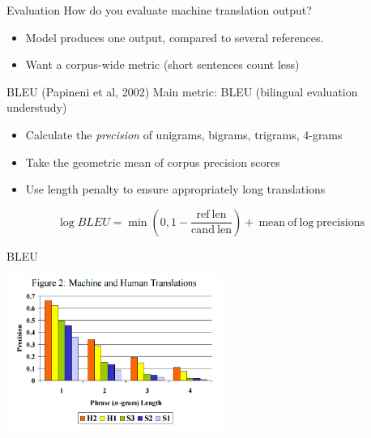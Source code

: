 \documentclass{beamer}
\begin{document}
{

}

\begin{frame}{Evaluation}
  How do you evaluate machine translation output?
  
  \begin{itemize}
  \item Model produces one output, compared to several references.
    \air
  \item Want a corpus-wide metric (short sentences count less)
  \end{itemize}

\end{frame}

\begin{frame}{BLEU (Papineni et al, 2002)}
    Main metric: BLEU (bilingual evaluation understudy)

  \begin{itemize}
  \item Calculate the \textit{precision} of unigrams, bigrams, trigrams, 4-grams
    \air 
  \item Take the geometric mean of corpus precision scores
    \air 
  \item Use length penalty to ensure appropriately long translations 
  \end{itemize}

  \[ \log BLEU = \min(0, 1 - \frac{\mathrm{ref\ len}}{\mathrm{cand\ len}}) + \mathrm{\ mean \ of \ log \ precisions} \] 

\end{frame}


\begin{frame}{BLEU}
  \begin{center}
    \includegraphics[width=7cm]{bleulen}
  \end{center}
\end{frame}
\end{document}
